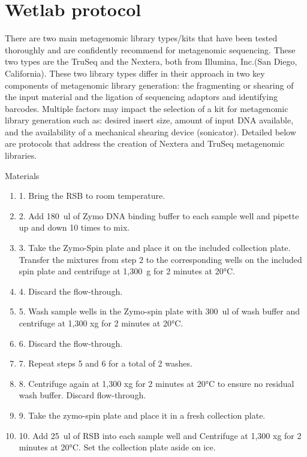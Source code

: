 \documentclass[graybox]{svmult}
\begin{document}
\section{Wetlab protocol}
There are two main metagenomic library types/kits that have been tested thoroughly and are confidently recommend for metagenomic sequencing.  These two types are the TruSeq and the Nextera, both from Illumina, Inc.(San Diego, California). These two library types differ in their approach in two key components of metagenomic library generation: the fragmenting or shearing of the input material and the ligation of sequencing adaptors and identifying barcodes. 
Multiple factors may impact the selection of a kit for metagenomic library generation such as: desired insert size, amount of input DNA available, and the availability of a mechanical shearing device (sonicator).
Detailed below are protocols that address the creation of Nextera and TruSeq metagenomic libraries. 

Materials

\begin{enumerate}
\item{1.      Bring the RSB to room temperature.}
\item{2.      Add 180~ul of Zymo DNA binding buffer to each sample well and pipette up and down 10 times to mix.}
\item{3.       Take the Zymo-Spin plate and place it on the included collection plate. Transfer the mixtures from step 2 to the corresponding wells on the included spin plate and centrifuge at 1,300~g for 2 minutes at 20°C.}
\item{4.      Discard the flow-through.}
\item{5.      Wash sample wells in the Zymo-spin plate with 300~ul of wash buffer and centrifuge at 1,300 xg for 2 minutes at 20°C.}
\item{6.      Discard the flow-through.}
\item{7.      Repeat steps 5 and 6 for a total of 2 washes.}
\item{8.      Centrifuge again at 1,300 xg for 2 minutes at 20°C to ensure no residual wash buffer. Discard flow-through.}
\item{9.      Take the zymo-spin plate and place it in a fresh collection plate.}
\item{10.     Add 25~ul of RSB into each sample well and Centrifuge at 1,300 xg for 2 minutes at 20°C. Set the collection plate aside on ice.}
\end{enumerate}
\end{document}
